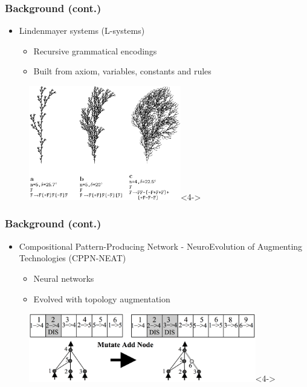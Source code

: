 \documentclass[serif, pdf]{beamer}
\begin{document}
\begin{frame}
    \frametitle{Background (cont.)}
    \begin{itemize}
        \item<1-> Lindenmayer systems (L-systems)
        \changefontsizes{11pt}
        \begin{itemize}
            \item<2-> Recursive grammatical encodings
            \item<3-> Built from axiom, variables, constants and rules
        \end{itemize}
    \end{itemize}
    \begin{figure}
        \centering
        \includegraphics[height = 5cm]{L-Systems_Examples.png}<4->
    \end{figure}
\end{frame}


\begin{frame}
    \frametitle{Background (cont.)}
    \begin{itemize}
        \item<1-> Compositional Pattern-Producing Network - NeuroEvolution of Augmenting Technologies (CPPN-NEAT)
        \changefontsizes{11pt}
        \begin{itemize}
            \item<2-> Neural networks
            \item<3-> Evolved with topology augmentation
        \end{itemize}
    \end{itemize}
    \begin{figure}
        \centering
        \includegraphics[height = 3cm]{CPPN_Topology_Augmentation.png}<4->
    \end{figure}
\end{frame}
\end{document}
